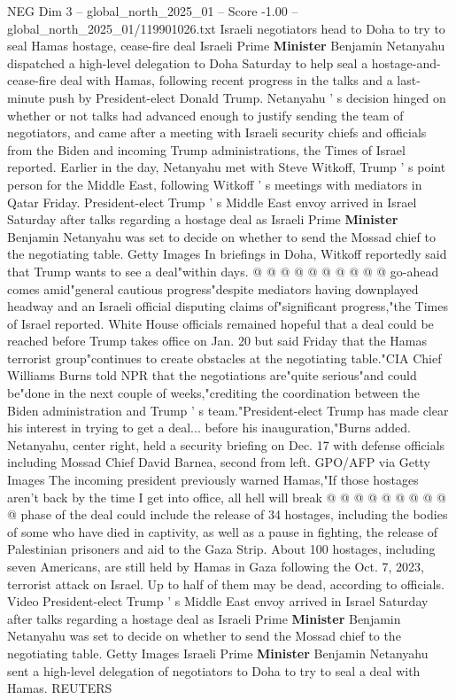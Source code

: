 \begin{textsample}{NEG Dim 3 – global\_north\_2025\_01 – Score -1.00 – global\_north\_2025\_01/119901026.txt}  \label{ex:f3_neg_195}
Israeli negotiators head to Doha to try to seal Hamas hostage, cease-fire deal Israeli Prime \textbf{Minister} Benjamin Netanyahu dispatched a high-level delegation to Doha Saturday to help seal a hostage-and-cease-fire deal with Hamas, following recent progress in the talks and a last-minute push by President-elect Donald Trump.
Netanyahu ' s decision hinged on whether or not talks had advanced enough to justify sending the team of negotiators, and came after a meeting with Israeli security chiefs and officials from the Biden and incoming Trump administrations, the Times of Israel reported.
Earlier in the day, Netanyahu met with Steve Witkoff, Trump ' s point person for the Middle East, following Witkoff ' s meetings with mediators in Qatar Friday.
President-elect Trump ' s Middle East envoy arrived in Israel Saturday after talks regarding a hostage deal as Israeli Prime \textbf{Minister} Benjamin Netanyahu was set to decide on whether to send the Mossad chief to the negotiating table.
Getty Images In briefings in Doha, Witkoff reportedly said that Trump wants to see a deal"within days. @ @ @ @ @ @ @ @ @ @ go-ahead comes amid"general cautious progress"despite mediators having downplayed headway and an Israeli official disputing claims of"significant progress,"the Times of Israel reported.
White House officials remained hopeful that a deal could be reached before Trump takes office on Jan. 20 but said Friday that the Hamas terrorist group"continues to create obstacles at the negotiating table."CIA Chief Williams Burns told NPR that the negotiations are"quite serious"and could be"done in the next couple of weeks,"crediting the coordination between the Biden administration and Trump ' s team."President-elect Trump has made clear his interest in trying to get a deal... before his inauguration,"Burns added.
Netanyahu, center right, held a security briefing on Dec. 17 with defense officials including Mossad Chief David Barnea, second from left.
GPO/AFP via Getty Images The incoming president previously warned Hamas,"If those hostages aren't back by the time I get into office, all hell will break @ @ @ @ @ @ @ @ @ @ phase of the deal could include the release of 34 hostages, including the bodies of some who have died in captivity, as well as a pause in fighting, the release of Palestinian prisoners and aid to the Gaza Strip.
About 100 hostages, including seven Americans, are still held by Hamas in Gaza following the Oct. 7, 2023, terrorist attack on Israel.
Up to half of them may be dead, according to officials.
Video President-elect Trump ' s Middle East envoy arrived in Israel Saturday after talks regarding a hostage deal as Israeli Prime \textbf{Minister} Benjamin Netanyahu was set to decide on whether to send the Mossad chief to the negotiating table.
Getty Images Israeli Prime \textbf{Minister} Benjamin Netanyahu sent a high-level delegation of negotiators to Doha to try to seal a deal with Hamas.
REUTERS

\end{textsample}
